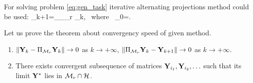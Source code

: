\documentclass[12pt,a4paper,fleqn,leqno]{article}
\begin{document}
For solving problem \eqref{eq:gen_task} iterative alternating projections method could be used:
\be
   \bfY_{k+1}=\Pi_\calH \Pi_{\calM_r} \bfY_{k}, \mbox{\ where\ } \bfY_{0}=\bfX.
\ee

Let us prove the theorem about convergency speed of given method.

\begin{theorem}
\label{th:converg}
\begin{enumerate}
Let space $\calM_r$ be closed in topology gererated by norm $\|\cdot\|$. Then
\item $\|\mathbf{Y}_k - \Pi_{\mathcal{M}_r}\mathbf{Y}_k\| \to 0$ as $k \to +\infty$, $\|\Pi_{\mathcal{M}_r}\mathbf{Y}_k - \mathbf{Y}_{k+1}\| \to 0$ as $k \to +\infty$.
\item There exists convergent subsequence of matrices $\mathbf{Y}_{i_1}, \mathbf{Y}_{i_2}, \ldots$ such that its limit $\mathbf{Y}^*$ lies in $\mathcal{M}_r \cap \mathcal{H}$.
\end{enumerate}
\end{theorem}
\end{document}
